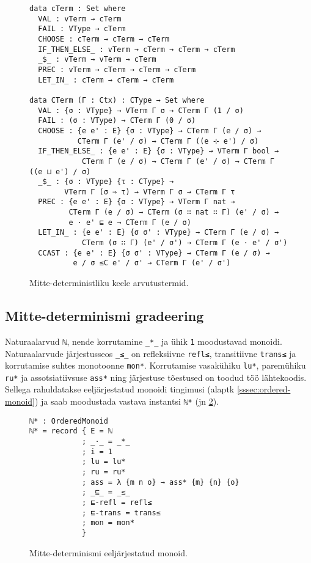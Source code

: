 \documentclass[a4paper,12pt]{article}
\begin{document}
\begin{figure}
  \begin{BVerbatim}
data cTerm : Set where
  VAL : vTerm → cTerm
  FAIL : VType → cTerm
  CHOOSE : cTerm → cTerm → cTerm
  IF_THEN_ELSE_ : vTerm → cTerm → cTerm → cTerm
  _$_ : vTerm → vTerm → cTerm
  PREC : vTerm → cTerm → cTerm → cTerm
  LET_IN_ : cTerm → cTerm → cTerm

data CTerm (Γ : Ctx) : CType → Set where
  VAL : {σ : VType} → VTerm Γ σ → CTerm Γ (1 / σ)
  FAIL : (σ : VType) → CTerm Γ (0 / σ)
  CHOOSE : {e e' : E} {σ : VType} → CTerm Γ (e / σ) →
           CTerm Γ (e' / σ) → CTerm Γ ((e ⊹ e') / σ)
  IF_THEN_ELSE_ : {e e' : E} {σ : VType} → VTerm Γ bool →
            CTerm Γ (e / σ) → CTerm Γ (e' / σ) → CTerm Γ ((e ⊔ e') / σ)
  _$_ : {σ : VType} {τ : CType} →
        VTerm Γ (σ ⇒ τ) → VTerm Γ σ → CTerm Γ τ
  PREC : {e e' : E} {σ : VType} → VTerm Γ nat →
         CTerm Γ (e / σ) → CTerm (σ ∷ nat ∷ Γ) (e' / σ) →
         e · e' ⊑ e → CTerm Γ (e / σ)
  LET_IN_ : {e e' : E} {σ σ' : VType} → CTerm Γ (e / σ) →
            CTerm (σ ∷ Γ) (e' / σ') → CTerm Γ (e · e' / σ')
  CCAST : {e e' : E} {σ σ' : VType} → CTerm Γ (e / σ) →
          e / σ ≤C e' / σ' → CTerm Γ (e' / σ')

  \end{BVerbatim}
  \caption{Mitte-deterministliku keele arvutustermid.}
  \label{fig:nd.cterms}
\end{figure}


\subsection{Mitte-determinismi gradeering}\label{ssec:nd.grading}

Naturaalarvud {\tt ℕ}, nende korrutamine {\tt _*_} ja ühik {\tt 1} moodustavad monoidi.
Naturaalarvude järjestusseos {\tt _≤_} on refleksiivne {\tt refl≤}, transitiivne {\tt trans≤} ja korrutamise suhtes monotoonne {\tt mon*}.
Korrutamise vasakühiku {\tt lu*}, paremühiku {\tt ru*} ja assotsiatiivsuse {\tt ass*} ning järjestuse tõestused on toodud töö lähtekoodis.
Sellega rahuldatakse eeljärjestatud monoidi tingimusi (alaptk \ref{sssec:ordered-monoid}) ja saab moodustada vastava instantsi {\tt ℕ*} (jn \ref{fig:nd.ordered-monoid}).
\begin{figure}
  \begin{BVerbatim}
ℕ* : OrderedMonoid
ℕ* = record { E = ℕ
            ; _·_ = _*_
            ; i = 1
            ; lu = lu*
            ; ru = ru*
            ; ass = λ {m n o} → ass* {m} {n} {o}
            ; _⊑_ = _≤_
            ; ⊑-refl = refl≤
            ; ⊑-trans = trans≤
            ; mon = mon*
            }
  \end{BVerbatim}
  \caption{Mitte-determinismi eeljärjestatud monoid.}
  \label{fig:nd.ordered-monoid}
\end{figure}
\end{document}
